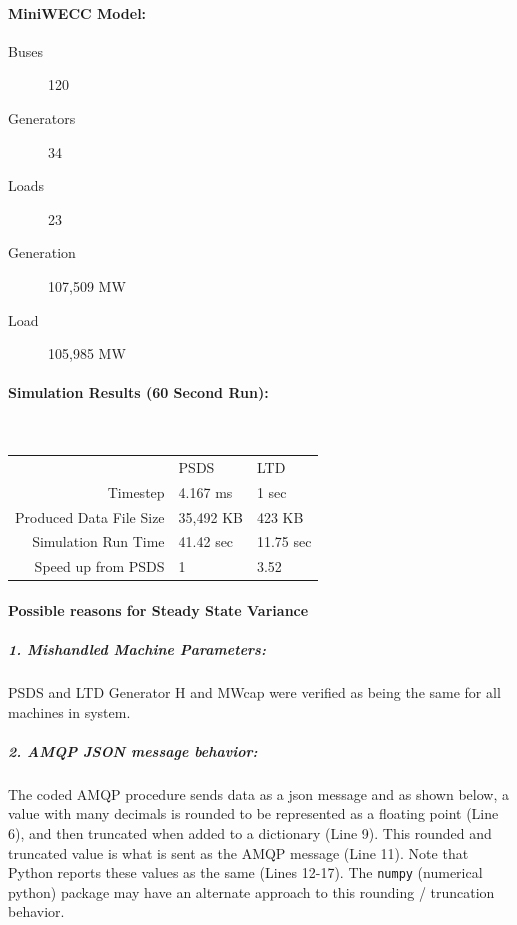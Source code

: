 \documentclass[12pt]{article}
\begin{document}
\pagebreak
\begin{minipage}{.3\linewidth}
\paragraph{MiniWECC Model:}
\begin{description}
\item[Buses] 120
\item[Generators] 34
\item[Loads] 23
\item [Generation] 107,509 MW
\item[Load] 105,985 MW
\end{description}
\end{minipage}       
\hspace{3em}
\begin{minipage}{.5\linewidth}
\paragraph{Simulation Results (60 Second Run): } \

\begin{tabular}{r l l}
	& PSDS & LTD \\
Timestep & 4.167 ms & 1 sec \\
Produced Data File Size & 35,492 KB & 423 KB \\
Simulation Run Time & 41.42 sec & 11.75 sec \\
Speed up from PSDS & 1 & 3.52
\end{tabular}
\end{minipage}  
                 

\paragraph{Possible reasons for Steady State Variance} 
\subparagraph{1. Mishandled Machine Parameters:} PSDS and LTD Generator H and MWcap were verified as being the same for all machines in system.

\subparagraph{2. AMQP JSON message behavior:}
The coded AMQP procedure sends data as a json message and as shown below, a value with many decimals is rounded to be represented as a floating point (Line 6), and then truncated when added to a dictionary (Line 9). This rounded and truncated value is what is sent as the AMQP message (Line 11). Note that Python reports these values as the same (Lines 12-17). The \verb|numpy| (numerical python) package may have an alternate approach to this rounding / truncation behavior.
\end{document}
